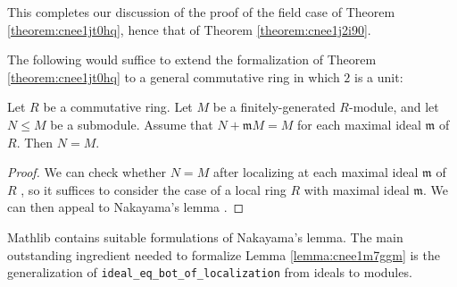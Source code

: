 \documentclass[reqno]{amsart} 
\begin{document}
This completes our discussion of the proof of the field case of Theorem \ref{theorem:cnee1jt0hq}, hence that of Theorem \ref{theorem:cnee1j2i90}.

The following would suffice to extend the formalization of Theorem \ref{theorem:cnee1jt0hq} to a general commutative ring in which $2$ is a unit:
\begin{lemma}\label{lemma:cnee1m7ggm}
Let $R$ be a commutative ring.  Let $M$ be a finitely-generated $R$-module, and let $N \leq M$ be a submodule.  Assume that $N + \mathfrak{m} M = M$ for each maximal ideal $\mathfrak{m}$ of $R$.  Then $N = M$.
\end{lemma}
\begin{proof}
  We can check whether $N = M$ after localizing at each maximal ideal $\mathfrak{m}$ of $R$ \cite[Prop 3.9]{MR3525784}, so it suffices to consider the case of a local ring $R$ with maximal ideal $\mathfrak{m}$.  We can then appeal to Nakayama's lemma \cite[Cor 2.7]{MR3525784}.
\end{proof}
\begin{remark}
  Mathlib contains suitable formulations of Nakayama's lemma.  The main outstanding ingredient needed to formalize Lemma \ref{lemma:cnee1m7ggm} is the generalization of \verb|ideal_eq_bot_of_localization| from ideals to modules.
\end{remark}

{} 
\end{document}
